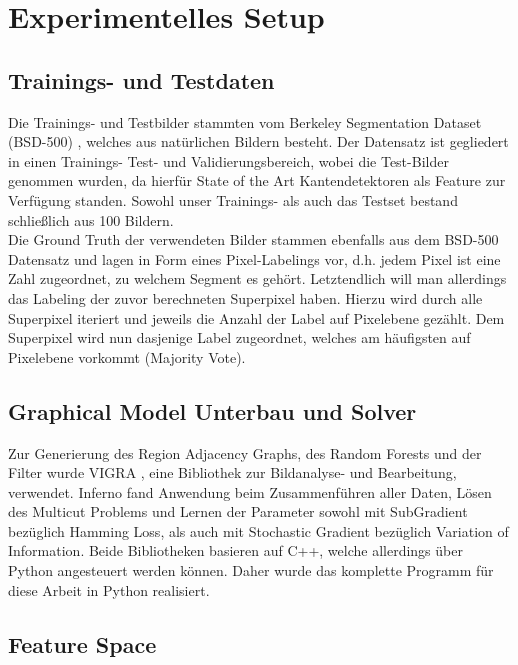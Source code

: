\chapter{Experimentelles Setup}\label{ch:mathtest} %

\section{Trainings- und Testdaten}


Die Trainings- und Testbilder stammten vom Berkeley Segmentation Dataset (BSD-500) \cite{BSD}, welches aus natürlichen Bildern besteht. Der Datensatz ist gegliedert in einen Trainings- Test- und Validierungsbereich, wobei die Test-Bilder genommen wurden, da hierfür State of the Art Kantendetektoren als Feature zur Verfügung standen. Sowohl unser Trainings- als auch das Testset bestand schließlich aus 100 Bildern. \\

Die Ground Truth der verwendeten Bilder stammen ebenfalls aus dem BSD-500 Datensatz und lagen in Form eines Pixel-Labelings vor, d.h. jedem Pixel ist eine Zahl zugeordnet, zu welchem Segment es gehört. Letztendlich will man allerdings das Labeling der zuvor berechneten Superpixel haben. Hierzu wird durch alle Superpixel iteriert und jeweils die Anzahl der Label auf Pixelebene gezählt. Dem Superpixel wird nun dasjenige Label zugeordnet, welches am häufigsten auf Pixelebene vorkommt (Majority Vote).


\section{Graphical Model Unterbau und Solver}


Zur Generierung des Region Adjacency Graphs, des Random Forests und der Filter wurde VIGRA \cite{VIGRA}, eine Bibliothek zur Bildanalyse- und Bearbeitung, verwendet. Inferno \cite{Inferno} fand Anwendung beim Zusammenführen aller Daten, Lösen des Multicut Problems und Lernen der Parameter sowohl mit SubGradient bezüglich Hamming Loss, als auch mit Stochastic Gradient bezüglich Variation of Information. Beide Bibliotheken basieren auf C++, welche allerdings über Python angesteuert werden können. Daher wurde das komplette Programm für diese Arbeit in Python realisiert.



\section{Feature Space}\label{sec:exp_featureSpace}



